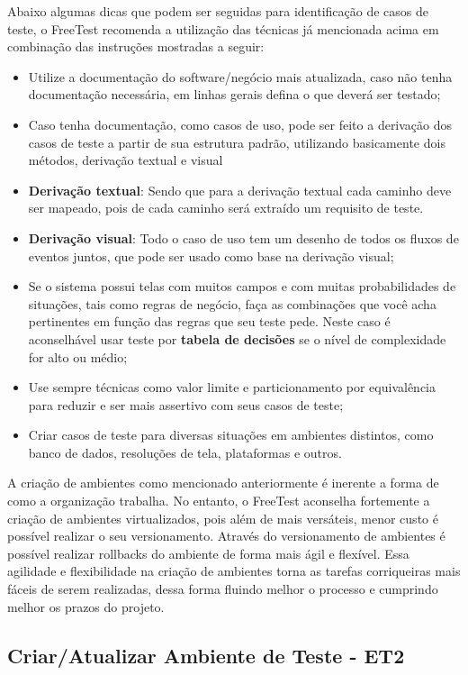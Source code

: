 Abaixo algumas dicas que podem ser seguidas para identificação de casos de teste, o FreeTest recomenda a utilização das técnicas já mencionada acima em combinação das instruções mostradas a seguir:

\begin{itemize}
    \item Utilize a documentação do software/negócio mais atualizada, caso não tenha documentação necessária, em linhas gerais defina o que deverá ser testado;
    \item Caso tenha documentação, como casos de uso, pode ser feito a derivação dos casos de teste a partir de sua estrutura padrão, utilizando basicamente dois métodos, derivação textual e visual
    \item \textbf{Derivação textual}: Sendo que para a derivação textual cada caminho deve ser mapeado, pois de cada caminho será extraído um requisito de teste.
    \item \textbf{Derivação visual}: Todo o caso de uso tem um desenho de todos os fluxos de eventos juntos, que pode ser usado como base na derivação visual;
    \item Se o sistema possui telas com muitos campos e com muitas probabilidades de situações, tais como regras de negócio, faça as combinações que você acha pertinentes em função das regras que seu teste pede. Neste caso é aconselhável usar teste por \textbf{tabela de decisões} se o nível de complexidade for alto ou médio;
    \item Use sempre técnicas como valor limite e particionamento por equivalência para reduzir e ser mais assertivo com seus casos de teste;
    \item Criar casos de teste para diversas situações em ambientes distintos, como banco de dados, resoluções de tela, plataformas e outros.
\end{itemize}

A criação de ambientes como mencionado anteriormente é inerente a forma de como a organização trabalha. No entanto, o FreeTest aconselha fortemente a criação de ambientes virtualizados, pois além de mais versáteis, menor custo é possível realizar o seu versionamento. Através do versionamento de ambientes é possível realizar rollbacks do ambiente de forma mais ágil e flexível. Essa agilidade e flexibilidade na criação de ambientes torna as tarefas corriqueiras mais fáceis de serem realizadas, dessa forma fluindo melhor o processo e cumprindo melhor os prazos do projeto.

\subsection{Criar/Atualizar Ambiente de Teste - ET2}
\label{sec:guiaet2}

